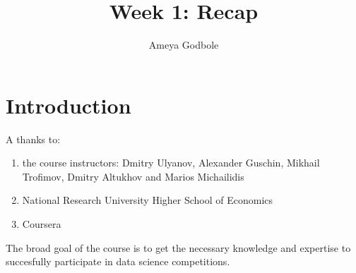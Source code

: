 \documentclass[a4paper]{article}
\title{Week 1: Recap\vspace{-2ex}}
\author{Ameya Godbole}
\date{\vspace{-5ex}}
\begin{document}
\maketitle

\section{Introduction}

A thanks to:
\begin{enumerate}
\item the course instructors: Dmitry Ulyanov, Alexander Guschin, Mikhail Trofimov, Dmitry Altukhov and Marios Michailidis
\item National Research University Higher School of Economics
\item Coursera
\end{enumerate}

The broad goal of the course is to get the necessary knowledge and expertise to succesfully participate in data science competitions.




\end{document}
